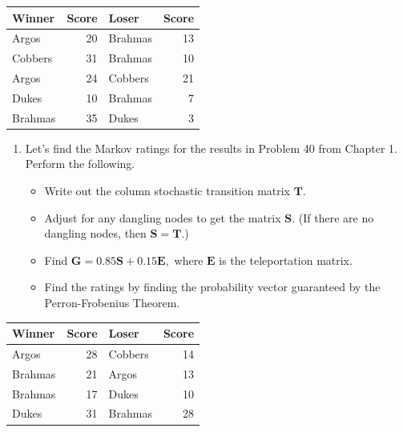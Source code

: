 \documentclass[
]{book}
\providecommand{\tightlist}{%
  \setlength{\itemsep}{0pt}\setlength{\parskip}{0pt}}
\theoremstyle{definition}
\theoremstyle{definition}
\theoremstyle{definition}
\theoremstyle{definition}
\theoremstyle{remark}
\begin{document}
\begin{longtable}{lrlr}
\toprule
Winner & Score & Loser & Score\\
\midrule
Argos & 20 & Brahmas & 13\\
Cobbers & 31 & Brahmas & 10\\
Argos & 24 & Cobbers & 21\\
Dukes & 10 & Brahmas & 7\\
Brahmas & 35 & Dukes & 3\\
\bottomrule
\end{longtable}

\begin{enumerate}
\def\labelenumi{\arabic{enumi}.}
\setcounter{enumi}{29}
\tightlist
\item
  Let's find the Markov ratings for the results in Problem 40 from Chapter 1. Perform the following.

  \begin{itemize}
  \tightlist
  \item
    Write out the column stochastic transition matrix \(\mathbf{T}.\)
  \item
    Adjust for any dangling nodes to get the matrix \(\mathbf{S}.\) (If there are no dangling nodes, then \(\mathbf{S}=\mathbf{T}\).)
  \item
    Find \(\mathbf{G}=0.85\mathbf{S}+0.15\mathbf{E},\) where \(\mathbf{E}\) is the teleportation matrix.
  \item
    Find the ratings by finding the probability vector guaranteed by the Perron-Frobenius Theorem.
  \end{itemize}
\end{enumerate}

\begin{longtable}{lrlr}
\toprule
Winner & Score & Loser & Score\\
\midrule
Argos & 28 & Cobbers & 14\\
Brahmas & 21 & Argos & 13\\
Brahmas & 17 & Dukes & 10\\
Dukes & 31 & Brahmas & 28\\
\bottomrule
\end{longtable}
\end{document}
